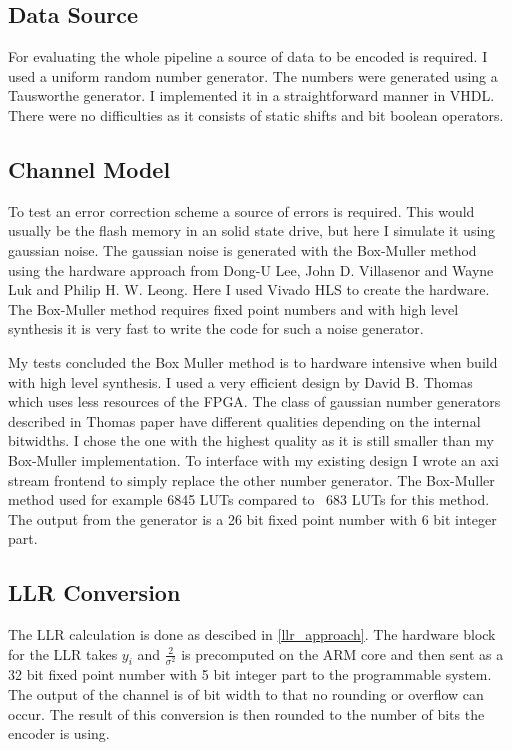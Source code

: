 \subsection{Data Source}
For evaluating the whole pipeline a source of data to be encoded is required. I used a uniform random number generator. The numbers were generated using a Tausworthe generator\cite{Ec96}. I implemented it in a straightforward manner in VHDL. There were no difficulties as it consists of static shifts and bit boolean operators.

\subsection{Channel Model}
To test an error correction scheme a source of errors is required. This would usually be the flash memory in an solid state drive, but here I simulate it using gaussian noise. The gaussian noise is generated with the Box-Muller method using the hardware approach from Dong-U Lee, John D. Villasenor and Wayne Luk and Philip H. W. Leong\cite{LeVi06}. Here I used Vivado HLS to create the hardware. The Box-Muller method requires fixed point numbers and with high level synthesis it is very fast to write the code for such a noise generator.

My tests concluded the Box Muller method is to hardware intensive when build with high level synthesis. I used a very efficient design by David B. Thomas\cite{Th14} which uses less resources of the FPGA. The class of gaussian number generators described in Thomas paper have different qualities depending on the internal bitwidths. I chose the one with the highest quality as it is still smaller than my Box-Muller implementation. To interface with my existing design I wrote an axi stream frontend to simply replace the other number generator. The Box-Muller method used for example 6845 LUTs compared to ~683 LUTs for this method. The output from the generator is a 26 bit fixed point number with 6 bit integer part.

\subsection{LLR Conversion}
The LLR calculation is done as descibed in \cref{llr_approach}. The hardware block for the LLR takes $y_i$ and $\frac{2}{\sigma^2}$ is precomputed on the ARM core and then sent as a 32 bit fixed point number with 5 bit integer part to the programmable system. The output of the channel is of bit width to that no rounding or overflow can occur. The result of this conversion is then rounded to the number of bits the encoder is using.

